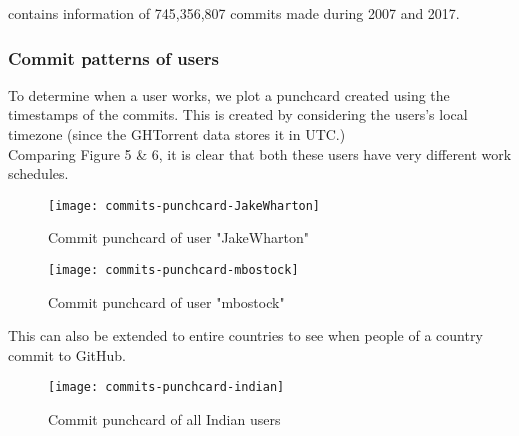  contains information of 745,356,807 commits made during 2007 and 2017.

\subsubsection{Commit patterns of users}

To determine when a user works, we plot a punchcard created using the timestamps of the commits.
This is created by considering the users's local timezone (since the GHTorrent data stores it in UTC.) \\

Comparing Figure 5 \& 6, it is clear that both these users have very different work schedules.

\begin{figure}[htb]
\centering
\texttt{[image: commits-punchcard-JakeWharton]}
\caption{Commit punchcard of user "JakeWharton"}
\end{figure}

\begin{figure}[htb]
\centering
\texttt{[image: commits-punchcard-mbostock]}
\caption{Commit punchcard of user "mbostock"}
\end{figure}

This can also be extended to entire countries to see when people of a country commit to GitHub.

\begin{figure}[htb]
\centering
\texttt{[image: commits-punchcard-indian]}
\caption{Commit punchcard of all Indian users}
\end{figure}

